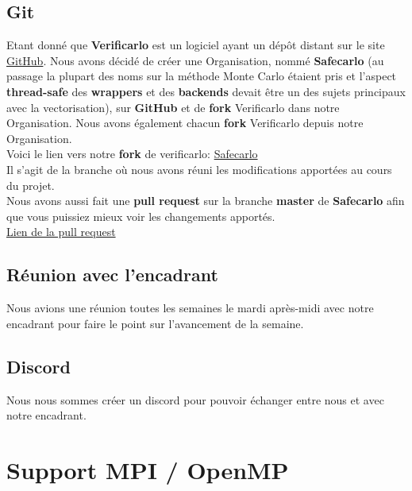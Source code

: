 \documentclass[11pt]{article}
\begin{document}
\subsection{Git}
\label{sec:org89b2786}

Etant donné que \textbf{Verificarlo} est un logiciel ayant un dépôt
distant sur le site \href{https://github.com}{GitHub}. Nous avons décidé de créer une
Organisation, nommé \textbf{Safecarlo} (au passage la plupart des noms sur la
méthode Monte Carlo étaient pris et l'aspect \textbf{thread-safe} des \textbf{wrappers}
et des \textbf{backends} devait être un des sujets principaux avec la
vectorisation), sur \textbf{GitHub} et de \textbf{fork} Verificarlo dans notre
Organisation. Nous avons également chacun \textbf{fork} Verificarlo depuis notre
Organisation.
\\ \vspace{5mm}
Voici le lien vers notre \textbf{fork} de verificarlo: \href{https://github.com/Safecarlo/verificarlo/tree/vectorization}{Safecarlo}
\\ \vspace{5mm}
Il s'agit de la branche où nous avons réuni les modifications
apportées au cours du projet.
\\ \vspace{5mm}
Nous avons aussi fait une \textbf{pull request} sur la branche \textbf{master} de
\textbf{Safecarlo} afin que vous puissiez mieux voir les changements apportés.
\\ \vspace{5mm}
\href{https://github.com/Safecarlo/verificarlo/pull/24}{Lien de la pull request}

\subsection{Réunion avec l'encadrant}
\label{sec:orgb505c3f}

Nous avions une réunion toutes les semaines le mardi après-midi
avec notre encadrant pour faire le point sur l'avancement de la
semaine.

\subsection{Discord}
\label{sec:org58f7e92}

Nous nous sommes créer un discord pour pouvoir échanger entre nous et avec
notre encadrant.

\section{Support MPI / OpenMP}
\label{sec:org35a7e85}
\end{document}
